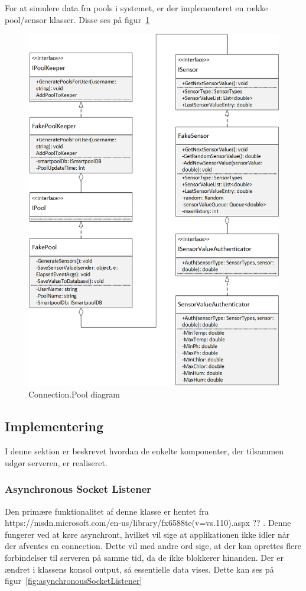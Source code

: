 For at simulere data fra pools i systemet, er der implementeret en række pool/sensor klasser. Disse ses på figur~\ref{fig:ConnectionPool}
\begin{figure}
\centering
\includegraphics[width=0.8\linewidth]{figs/connection/ConnectionPool.png}
\caption{Connection.Pool diagram}
\label{fig:ConnectionPool}
\end{figure}

\subsection{Implementering}
I denne sektion er beskrevet hvordan de enkelte komponenter, der tilsammen udgør serveren, er realiseret.

\subsubsection{Asynchronous Socket Listener}
Den primære funktionalitet af denne klasse er hentet fra https://msdn.microsoft.com/en-us/library/fx6588te(v=vs.110).aspx ?? . Denne fungerer ved at køre asynchront, hvilket vil sige at applikationen ikke idler når der afventes en connection. Dette vil med andre ord sige, at der kan oprettes flere forbindelser til serveren på samme tid, da de ikke blokkerer hinanden.
Der er ændret i klassens konsol output, så essentielle data vises. Dette kan ses på figur~\ref{fig:asynchronousSocketListener}

